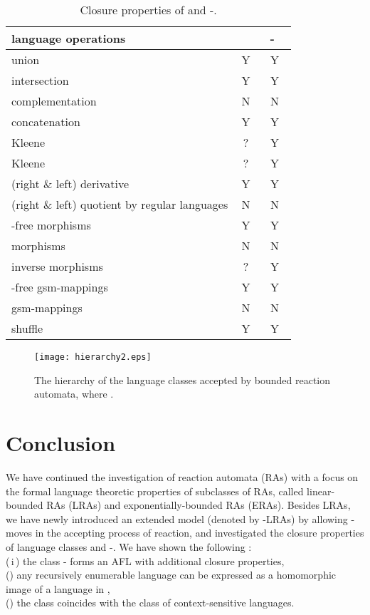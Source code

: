 \documentclass[preprint,fleqn,1p]{elsarticle}
\def\rnum#1{\resizebox{0.5em}{\height}{\expandafter{\romannumeral #1}}}
\begin{document}
\begin{table}
\caption{Closure properties of  and -.}
\begin{center}
\begin{tabular}{|l|c|c|} \hline
language operations & \  \ & \ - \  \\ \hline \hline
union & Y & Y \\ \hline 
intersection & Y & Y \\ \hline
complementation & N & N \\ \hline
concatenation & Y & Y \\ \hline
Kleene  & ? & Y \\ \hline
Kleene  & ? & Y \\ \hline
(right \& left) derivative & Y & Y \\ \hline
(right \& left) quotient by regular languages & N & N \\ \hline
-free morphisms & Y & Y \\ \hline
morphisms & N & N \\ \hline
inverse morphisms & ? & Y \\ \hline
-free gsm-mappings & Y & Y \\ \hline
gsm-mappings & N & N \\ \hline
shuffle & Y & Y \\ \hline
\end{tabular}
\end{center}
\end{table}

\begin{figure}[t]
\centerline{
\texttt{[image: hierarchy2.eps]}}
\caption{The hierarchy of the language classes accepted by bounded reaction automata, where .}
\label{hierarchy}
\end{figure}


\section{Conclusion}

We have continued the investigation of reaction automata (RAs)  with  a focus on the formal language theoretic properties of subclasses of RAs, called  linear-bounded RAs (LRAs) and  exponentially-bounded RAs (ERAs).   Besides LRAs, we have newly introduced an extended model 
(denoted by -LRAs) by allowing -moves in the accepting process of reaction, and investigated the closure properties of language classes  and -. 
We have shown the following :  \\
\quad (\,i\,) the class  - forms an AFL with additional closure properties, \\
\quad (\rnum{2})  any recursively enumerable language can be expressed as  
a homomorphic image of a language in , \\
\quad (\rnum{3}) the class    coincides with the class of context-sensitive languages. 
\end{document}
